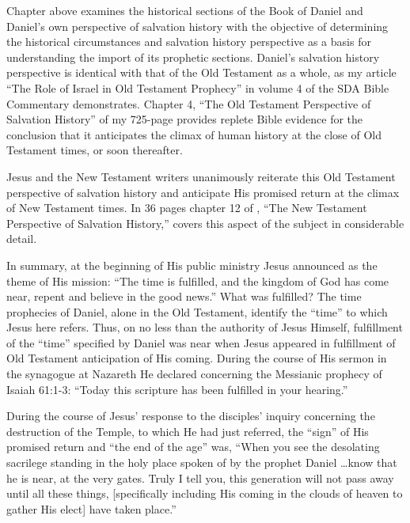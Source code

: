 Chapter  above examines the historical sections of the Book of Daniel and
Daniel's own perspective of salvation history with the objective of
determining the historical circumstances and salvation history perspective
as a basis for understanding the import of its prophetic sections. Daniel's
salvation history perspective is identical with that of the Old Testament as
a whole, as my article ``The Role of Israel in Old Testament Prophecy'' in
volume 4 of the SDA Bible Commentary demonstrates. Chapter 4, ``The Old Testament
Perspective of Salvation History'' of my 725-page 
provides replete Bible evidence for the
conclusion that it anticipates the climax of human history at the close of
Old Testament times, or soon thereafter.

Jesus and the New Testament writers unanimously reiterate this Old Testament
perspective of salvation history and anticipate His promised return at the
climax of New Testament times. In 36 pages chapter 12 of ,
``The New Testament Perspective of Salvation History,'' covers this
aspect of the subject in considerable detail.

In summary, at the beginning of His public ministry Jesus announced as the
theme of His mission: ``The time is fulfilled, and the kingdom of God has
come near, repent and believe in the good news.'' What was fulfilled? The
time prophecies of Daniel, alone in the Old Testament, identify the ``time''
to which Jesus here refers. Thus, on no less than the authority of Jesus
Himself, fulfillment of the ``time'' specified by Daniel was near when Jesus
appeared in fulfillment of Old Testament anticipation of His coming. During
the course of His sermon in the synagogue at Nazareth He declared concerning
the Messianic prophecy of Isaiah 61:1-3: ``Today this scripture has been
fulfilled in your hearing.''

During the course of Jesus' response to the disciples' inquiry concerning
the destruction of the Temple, to which He had just referred, the ``sign'' of
His promised return and ``the end of the age'' was, ``When you see the
desolating sacrilege standing in the holy place spoken of by the prophet
Daniel \ldots know that he is near, at the very gates. Truly I tell you, this
generation will not pass away until all these things, [specifically
including His coming in the clouds of heaven to gather His elect] have taken
place.''

